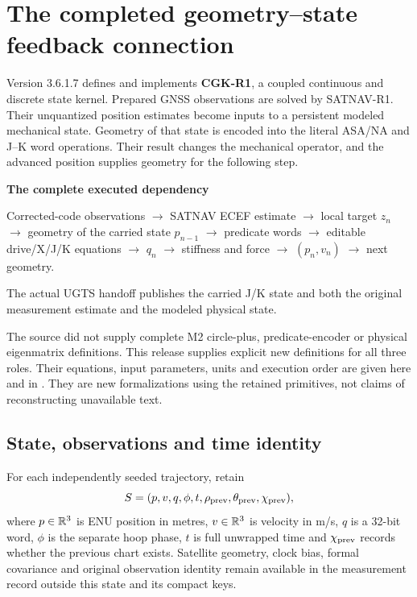 \section{The completed geometry--state feedback connection}
\label{sec:coupled}
Version 3.6.1.7 defines and implements \textbf{CGK-R1}, a coupled continuous and
discrete state kernel. Prepared GNSS observations are solved by SATNAV-R1. Their
unquantized position estimates become inputs to a persistent modeled mechanical
state. Geometry of that state is encoded into the literal ASA/NA and J--K word
operations. Their result changes the mechanical operator, and the advanced
position supplies geometry for the following step.

\begin{panel}
\textbf{The complete executed dependency}\par
Corrected-code observations $\to$ SATNAV ECEF estimate $\to$ local target $z_n$
$\to$ geometry of the carried state $p_{n-1}$ $\to$ predicate words
$\to$ editable drive/X/J/K equations $\to$ $q_n$
$\to$ stiffness and force $\to$ $(p_n,v_n)$ $\to$ next geometry.\par
The actual UGTS handoff publishes the carried J/K state and both the original
measurement estimate and the modeled physical state.
\end{panel}

The source did not supply complete M2 circle-plus, predicate-encoder or physical
eigenmatrix definitions. This release supplies explicit new definitions for all
three roles. Their equations, input parameters, units and execution order are
given here and in . They are new formalizations
using the retained primitives, not claims of reconstructing unavailable text.

\subsection{State, observations and time identity}
For each independently seeded trajectory, retain
\begin{equation}
S=(p,v,q,\phi,t,\rho_{\rm prev},\theta_{\rm prev},\chi_{\rm prev}),
\end{equation}
where $p\in\mathbb R^3$ is ENU position in metres, $v\in\mathbb R^3$ is velocity in m/s,
$q$ is a 32-bit word, $\phi$ is the separate hoop phase, $t$ is full unwrapped
time and $\chi_{\rm prev}$ records whether the previous chart exists. Satellite
geometry, clock bias, formal covariance and original observation identity remain
available in the measurement record outside this state and its compact keys.

